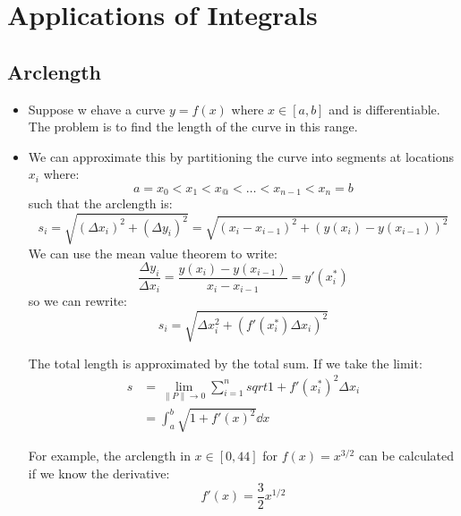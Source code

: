 \section{Applications of Integrals}
\subsection{Arclength}
\begin{itemize}
    \item Suppose w ehave a curve $y = f(x)$ where $x \in [a,b]$ and is differentiable. The problem is to find the length of the curve in this range.
    \begin{figure}[ht]
        \centering
    \end{figure}
    \item We can approximate this by partitioning the curve into segments at locations $x_i$ where:
    \begin{equation}
        a = x_0 < x_1 <x_@ < \dots < x_{n-1} < x_{n} = b
    \end{equation}
    such that the arclength is:
    \begin{equation}
        s_i = \sqrt{(\Delta x_i)^2 + (\Delta y_i)^2} = \sqrt{(x_i-x_{i-1})^2+(y(x_i)-y(x_{i-1}))^2}
    \end{equation}
    We can use the mean value theorem to write:
    \begin{equation}
        \frac{\Delta y_i}{\Delta x_i} = \frac{y(x_i)-y(x_{i-1})}{x_i-x_{i-1}} = y'(x_i^*)
    \end{equation}
    so we can rewrite:
    \begin{equation}
        s_i = \sqrt{\Delta x_i^2 + \left(f'(x_i^*)\Delta x_i\right)^2}
    \end{equation}
    \begin{figure}[ht]
        \centering
    \end{figure}
    The total length is approximated by the total sum. If we take the limit:
    \begin{align}
        s &= \lim_{\lVert P \rVert \to 0} \sum_{i=1}^n sqrt{1+f'(x_i^*)^2} \Delta x_i \\ 
        &= \int_a^b \sqrt{1+f'(x)^2} \dd{x}
    \end{align}
    \begin{example}
        For example, the arclength in $x \in [0,44]$ for $f(x)=x^{3/2}$ can be calculated if we know the derivative:
        \begin{equation}
            f'(x) = \frac{3}{2}x^{1/2}

\end{equation}
\end{example}
\end{itemize}
